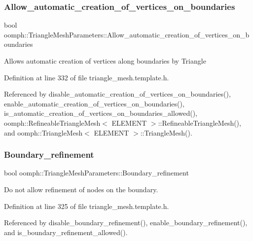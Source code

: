 \subsubsection{\texorpdfstring{Allow\+\_\+automatic\+\_\+creation\+\_\+of\+\_\+vertices\+\_\+on\+\_\+boundaries}{Allow\_automatic\_creation\_of\_vertices\_on\_boundaries}}
{\footnotesize\ttfamily bool oomph\+::\+Triangle\+Mesh\+Parameters\+::\+Allow\+\_\+automatic\+\_\+creation\+\_\+of\+\_\+vertices\+\_\+on\+\_\+boundaries\hspace{0.3cm}{\ttfamily [protected]}}

Allows automatic creation of vertices along boundaries by Triangle 

Definition at line 332 of file triangle\+\_\+mesh.\+template.\+h.



Referenced by disable\+\_\+automatic\+\_\+creation\+\_\+of\+\_\+vertices\+\_\+on\+\_\+boundaries(), enable\+\_\+automatic\+\_\+creation\+\_\+of\+\_\+vertices\+\_\+on\+\_\+boundaries(), is\+\_\+automatic\+\_\+creation\+\_\+of\+\_\+vertices\+\_\+on\+\_\+boundaries\+\_\+allowed(), oomph\+::\+Refineable\+Triangle\+Mesh$<$ E\+L\+E\+M\+E\+N\+T $>$\+::\+Refineable\+Triangle\+Mesh(), and oomph\+::\+Triangle\+Mesh$<$ E\+L\+E\+M\+E\+N\+T $>$\+::\+Triangle\+Mesh().

\mbox{\label{classoomph_1_1TriangleMeshParameters_a0a97e7b7a890c2584206eb6b584ae5f3}} 
\subsubsection{\texorpdfstring{Boundary\+\_\+refinement}{Boundary\_refinement}}
{\footnotesize\ttfamily bool oomph\+::\+Triangle\+Mesh\+Parameters\+::\+Boundary\+\_\+refinement\hspace{0.3cm}{\ttfamily [protected]}}



Do not allow refinement of nodes on the boundary. 



Definition at line 325 of file triangle\+\_\+mesh.\+template.\+h.



Referenced by disable\+\_\+boundary\+\_\+refinement(), enable\+\_\+boundary\+\_\+refinement(), and is\+\_\+boundary\+\_\+refinement\+\_\+allowed().


